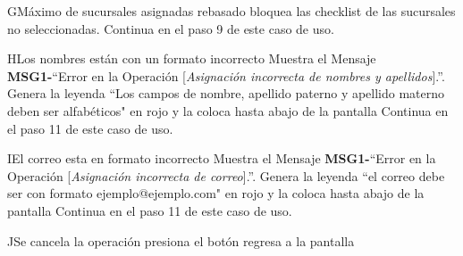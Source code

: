 	\begin{UCtrayectoriaA}{G}{Máximo de sucursales asignadas rebasado}
			\UCpaso bloquea las checklist de las sucursales no seleccionadas.
			\UCpaso Continua en el paso 9 de este caso de uso.
		\end{UCtrayectoriaA}		
		\begin{UCtrayectoriaA}{H}{Los nombres están con un formato incorrecto}
		\UCpaso Muestra el Mensaje {\bf MSG1-}``Error en la Operación [{\em Asignación incorrecta de nombres y apellidos}].''.
			\UCpaso Genera la leyenda ``Los campos de nombre, apellido paterno y apellido materno deben ser alfabéticos" en rojo y la coloca hasta abajo de la pantalla 
			\UCpaso Continua en el paso 11 de este caso de uso.
		\end{UCtrayectoriaA}
		\begin{UCtrayectoriaA}{I}{El correo esta en formato incorrecto}
		\UCpaso Muestra el Mensaje {\bf MSG1-}``Error en la Operación [{\em Asignación incorrecta de correo}].''.
			\UCpaso Genera la leyenda ``el correo debe ser con formato ejemplo@ejemplo.com" en rojo y la coloca hasta abajo de la pantalla 
			\UCpaso Continua en el paso 11 de este caso de uso.
		\end{UCtrayectoriaA}
	\begin{UCtrayectoriaA}{J}{Se cancela la operación}
			\UCpaso [\UCactor] presiona el botón 
			\UCpaso regresa a la pantalla  
		\end{UCtrayectoriaA}
